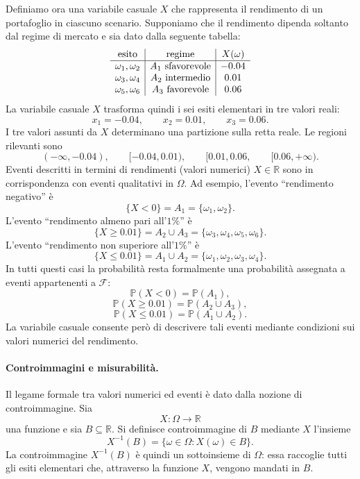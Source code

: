 Definiamo ora una variabile casuale $X$ che rappresenta il rendimento di un
portafoglio in ciascuno scenario. Supponiamo che il rendimento dipenda
soltanto dal regime di mercato e sia dato dalla seguente tabella:
\[%
\begin{array}
[c]{c|c|c}%
\mbox{esito} & \mbox{regime} & X(\omega)\\\hline
\omega_{1},\omega_{2} & A_{1}\ \mbox{sfavorevole} & -0.04\\
\omega_{3},\omega_{4} & A_{2}\ \mbox{intermedio} & 0.01\\
\omega_{5},\omega_{6} & A_{3}\ \mbox{favorevole} & 0.06
\end{array}
\]
La variabile casuale $X$ trasforma quindi i sei esiti elementari in tre valori
reali:
\[
x_{1}=-0.04, \qquad x_{2}=0.01, \qquad x_{3}=0.06.
\]
I tre valori assunti da $X$ determinano una partizione sulla retta reale. Le
regioni rilevanti sono
\[
(-\infty,-0.04), \qquad[-0.04,0.01), \qquad[0.01,0.06, \qquad[0.06,+\infty).
\]
Eventi descritti in termini di rendimenti (valori numerici) $X \in\mathbb{R}$
sono in corrispondenza con eventi qualitativi in $\Omega$. Ad esempio,
l'evento ``rendimento negativo'' \`{e}
\[
\{X<0\}=A_{1}=\{\omega_{1},\omega_{2}\}.
\]
L'evento ``rendimento almeno pari all'$1\%$'' \`{e}
\[
\{X\geq0.01\}=A_{2}\cup A_{3} =\{\omega_{3},\omega_{4},\omega_{5},\omega
_{6}\}.
\]
L'evento ``rendimento non superiore all'$1\%$'' \`{e}
\[
\{X\leq0.01\}=A_{1}\cup A_{2} =\{\omega_{1},\omega_{2},\omega_{3},\omega
_{4}\}.
\]
In tutti questi casi la probabilit\`{a} resta formalmente una probabilit\`{a}
assegnata a eventi appartenenti a $\mathcal{F}$:
\[
\mathbb{P}(X<0)=\mathbb{P}(A_{1}),
\]
\[
\mathbb{P}(X\geq0.01)=\mathbb{P}(A_{2}\cup A_{3}),
\]
\[
\mathbb{P}(X\leq0.01)=\mathbb{P}(A_{1}\cup A_{2}).
\]
La variabile casuale consente per\`{o} di descrivere tali eventi mediante
condizioni sui valori numerici del rendimento.

\paragraph{Controimmagini e misurabilit\`{a}.}

Il legame formale tra valori numerici ed eventi \`{e} dato dalla nozione di
controimmagine. Sia
\[
X:\Omega\longrightarrow\mathbb{R}
\]
una funzione e sia $B\subseteq\mathbb{R}$. Si definisce controimmagine di $B$
mediante $X$ l'insieme
\[
X^{-1}(B)=\{\omega\in\Omega:X(\omega)\in B\}.
\]
La controimmagine $X^{-1}(B)$ \`{e} quindi un sottoinsieme di $\Omega$: essa
raccoglie tutti gli esiti elementari che, attraverso la funzione $X$, vengono
mandati in $B$.

